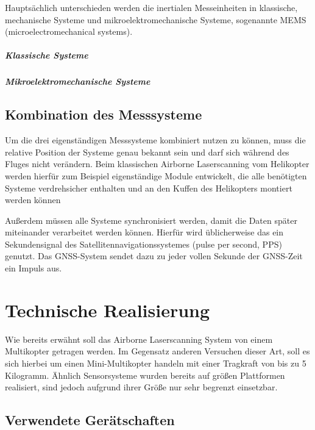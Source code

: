 \documentclass[a4paper,12pt,bibliography=totoc, listof=totoc,titlepage,pointlessnumbers]{scrreprt}
\begin{document}
Hauptsächlich unterschieden werden die inertialen Messeinheiten in klassische, mechanische Systeme und mikroelektromechanische Systeme, sogenannte MEMS (microelectromechanical systems).

\paragraph{Klassische Systeme}


\paragraph{Mikroelektromechanische Systeme}
\citep[S. 10ff]{Willemsen}



\section{Kombination des Messsysteme}
Um die drei eigenständigen Messsysteme kombiniert nutzen zu können, muss die relative Position der Systeme genau bekannt sein und darf sich während des Fluges nicht verändern. Beim klassischen Airborne Laserscanning vom Helikopter werden hierfür zum Beispiel eigenständige Module entwickelt, die alle benötigten Systeme verdrehsicher enthalten und an den Kuffen des Helikopters montiert werden können \citep[S. 23f]{beraldin}

Außerdem müssen alle Systeme synchronisiert werden, damit die Daten später miteinander verarbeitet werden können. Hierfür wird üblicherweise das ein Sekundensignal des Satellitennavigationssystemes (pulse per second, PPS) genutzt. Das GNSS-System sendet dazu zu jeder vollen Sekunde der GNSS-Zeit ein Impuls aus.

\chapter{Technische Realisierung}
\label{c:realisierung}

Wie bereits erwähnt soll das Airborne Laserscanning System von einem Multikopter getragen werden. Im Gegensatz anderen Versuchen dieser Art, soll es sich hierbei um einen Mini-Multikopter handeln mit einer Tragkraft von bis zu 5 Kilogramm. Ähnlich Sensorsysteme wurden bereits auf größen Plattformen realisiert, sind jedoch aufgrund ihrer Größe nur sehr begrenzt einsetzbar. \citep[S. 19]{uav}

\section {Verwendete Gerätschaften}
\end{document}
